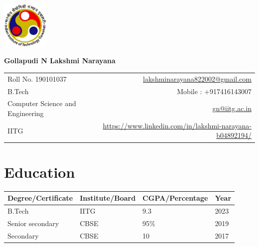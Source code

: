 \documentclass[a4paper,10pt]{report}
\begin{document}
\vspace{-0.1000pt}


\parbox{2.3cm}{

\includegraphics[width=2.25cm,clip]{iitg_logo.jpg}

}
\parbox{\dimexpr\linewidth-2.3cm\relax}{

\textbf{\huge Gollapudi N Lakshmi Narayana}\\
\begin{tabular*}{\textwidth}{l@{\hskip 1.25cm}r}


{Roll No. 190101037}&\href{mailto:lakshminarayana822002@gmail.com}{ lakshminarayana822002@gmail.com}\\
{B.Tech}& Mobile : +917416143007\\
{Computer Science and Engineering}&\href{mailto:gn@iitg.ac.in}{ gn@iitg.ac.in}\\
{IITG} & \href{https://www.linkedin.com/in/lakshmi-narayana-b04892194//}{https://www.linkedin.com/in/lakshmi-narayana-b04892194/}

\end{tabular*}
}


\vspace{5pt}


\section{Education}
\centering
 \begin{tabu} to 1\textwidth { | X[c] | X[c] | X[c] | X[c]| }
 \hline   \textbf{Degree/Certificate} & \textbf{Institute/Board} & \textbf{CGPA/Percentage} & \textbf{Year} \\
 
\hline B.Tech& IITG& 9.3& 2023\\
\hline Senior secondary& CBSE& 95\%& 2019\\
\hline Secondary& CBSE& 10& 2017\\

\hline
\end{tabu}
\end{document}
